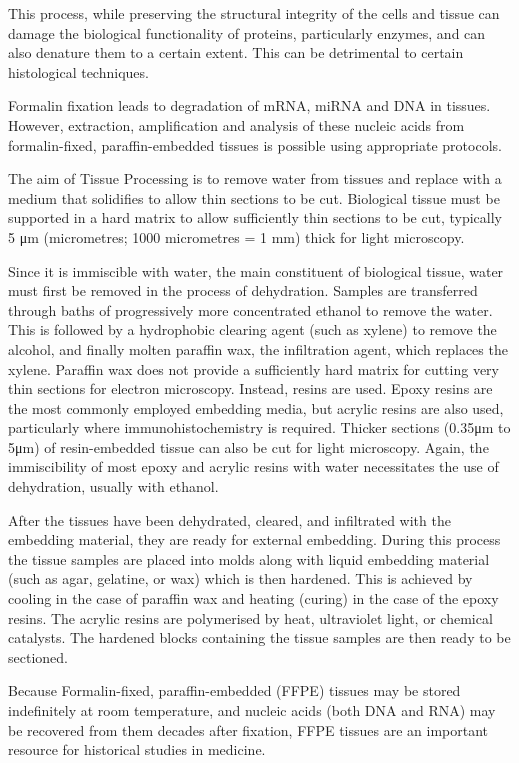 This process, while preserving the structural integrity of the cells and tissue
can damage the biological functionality of proteins, particularly enzymes, and
can also denature them to a certain extent. This can be detrimental to certain
histological techniques.

Formalin fixation leads to degradation of mRNA, miRNA and DNA in tissues.
However, extraction, amplification and analysis of these nucleic acids from
formalin-fixed, paraffin-embedded tissues is possible using appropriate
protocols.

The aim of Tissue Processing is to remove water from tissues and replace with a
medium that solidifies to allow thin sections to be cut. Biological tissue must
be supported in a hard matrix to allow sufficiently thin sections to be cut,
typically 5 μm (micrometres; 1000 micrometres = 1 mm) thick for light microscopy.

Since it is immiscible with water, the main constituent of biological tissue,
water must first be removed in the process of dehydration. Samples are
transferred through baths of progressively more concentrated ethanol to remove
the water. This is followed by a hydrophobic clearing agent (such as xylene) to
remove the alcohol, and finally molten paraffin wax, the infiltration agent,
which replaces the xylene. Paraffin wax does not provide a sufficiently hard
matrix for cutting very thin sections for electron microscopy. Instead, resins
are used. Epoxy resins are the most commonly employed embedding media, but
acrylic resins are also used, particularly where immunohistochemistry is
required. Thicker sections (0.35μm to 5μm) of resin-embedded tissue can also be
cut for light microscopy. Again, the immiscibility of most epoxy and acrylic
resins with water necessitates the use of dehydration, usually with ethanol.

After the tissues have been dehydrated, cleared, and infiltrated with the
embedding material, they are ready for external embedding. During this process
the tissue samples are placed into molds along with liquid embedding material
(such as agar, gelatine, or wax) which is then hardened. This is achieved by
cooling in the case of paraffin wax and heating (curing) in the case of the
epoxy resins. The acrylic resins are polymerised by heat, ultraviolet light, or
chemical catalysts. The hardened blocks containing the tissue samples are then
ready to be sectioned.

Because Formalin-fixed, paraffin-embedded (FFPE) tissues may be stored
indefinitely at room temperature, and nucleic acids (both DNA and RNA) may be
recovered from them decades after fixation, FFPE tissues are an important
resource for historical studies in medicine.

